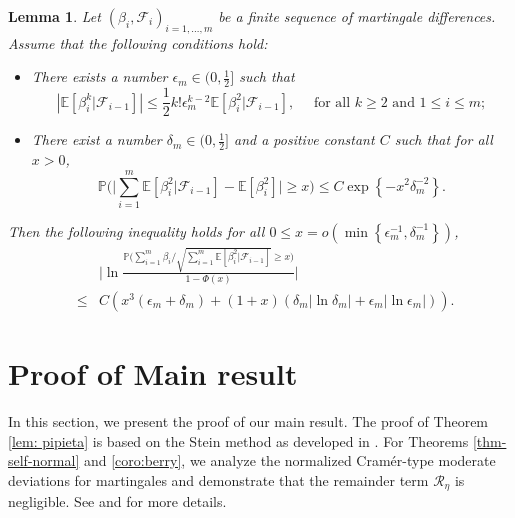 \documentclass[12pt]{amsart}
\newtheorem{lemma}[theorem]{Lemma}
\theoremstyle{definition}
\theoremstyle{remark}
\numberwithin{equation}{section}
\newcommand{\E}{\mathbb{E}}            %
\newcommand{\PP}{\mathbb{P}}
\begin{document}
\begin{lemma}{\cite[Lemma 3.5]{fan2024normalized}}\label{lem:fan}
Let $\left(\beta_i, \mathcal{F}_i\right)_{i=1, \ldots, m}$ be a finite sequence of martingale differences. Assume that the following conditions hold:
\begin{itemize}
	\item[(A1)] There exists a number $\epsilon_m \in(0, \frac{1}{2}]$ such that
	$$
	\left|\E[\beta_i^k | \mathcal{F}_{i-1}]\right| \leq \frac{1}{2} k!\epsilon_m^{k-2} \E[\beta_i^2|\mathcal{F}_{i-1}], \quad \text { for all } k \geq 2 \text { and } 1 \leq i \leq m ;
	$$
	\item[(A2)] There exist a number $\delta_m \in(0, \frac{1}{2}]$ and a positive constant $C$ such that for all $x>0$,
	$$
	\PP\big(\big|\sum_{i=1}^m\E[\beta_i^2|\mathcal{F}_{i-1}]-\E[\beta_i^2]\big| \geq x\big) \leq C \exp \left\{-x^2 \delta_m^{-2}\right\}.
	$$
\end{itemize}
Then the following inequality holds for all $0 \leq x=o\left(\min \left\{\epsilon_m^{-1}, \delta_m^{-1}\right\}\right)$,
\begin{eqnarray*}
&&\Big|\ln \frac{\PP\big(\sum_{i=1}^m\beta_i / \sqrt{\sum_{i=1}^m\E[\beta_i^2|\mathcal{F}_{i-1}]}\ge x\big)}{1-\Phi(x)}\Big| \\
&\leq& C\left(x^3\left(\epsilon_m+\delta_m\right)+(1+x)\left(\delta_m\left|\ln \delta_m\right|+\epsilon_m\left|\ln \epsilon_m\right|\right)\right) .	
\end{eqnarray*}
\end{lemma}



\section{Proof of Main result}\label{sec:5}

In this section, we present the proof of our main result. The proof of Theorem \ref{lem: pipieta} is based on the Stein method as developed in \cite[Theorem 2.5]{FSX19}. For Theorems \ref{thm-self-normal} and \ref{coro:berry}, we analyze the normalized Cramér-type moderate deviations for martingales and demonstrate that the remainder term $\mathcal{R}_\eta$ is negligible. See \cite{fan2022cram1} and \cite{fan2024normalized}  for more details.
\end{document}
